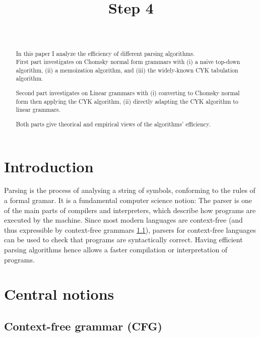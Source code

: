 \documentclass[twocolumn]{article}
\title{Step 4}
\author{\hwname \\ \hwemail}
\begin{document}
\maketitle
\begin{abstract}
  In this paper I analyze the efficiency of different parsing algorithms.\\
  First part investigates on Chomsky normal form grammars with (i) a naive top-down algorithm, (ii) a memoization algorithm, and (iii) the widely-known CYK tabulation algorithm.\par
  Second part investigates on Linear grammars with (i) converting to Chomsky normal form then applying the CYK algorithm, (ii) directly adapting the CYK algorithm to linear grammars.\par
  Both parts give theorical and empirical views of the algorithms' efficiency.
\end{abstract}

\section*{Introduction}
Parsing is the process of analysing a string of symbols, conforming to the rules
of a formal gramar.
It is a fundamental computer science notion: The parser is one of the main
parts of compilers and interpreters, which describe how programs are executed by
the machine. Since most modern languages are context-free (and thus expressible
by context-free grammars \ref{cfg}), parsers for context-free languages can be
used to check that programs are syntactically correct.
Having efficient parsing algorithms hence allows a faster compilation or
interpretation of programs.

\section{Central notions}
\subsection{Context-free grammar (CFG)} \label{cfg}

\end{document}
